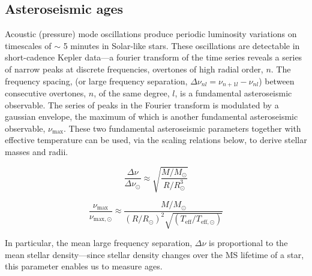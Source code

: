 \documentclass[12pt,preprint]{aastex}
\begin{document}
\subsection{Asteroseismic ages}
\label{sec:asteroseismic_targets}

Acoustic (pressure) mode oscillations produce periodic luminosity variations on timescales of $\sim$ 5 minutes in Solar-like stars.
These oscillations are detectable in short-cadence Kepler data---a fourier transform of the time series reveals a series of narrow peaks at discrete frequencies, overtones of high radial order, $n$.
The frequency spacing, (or large frequency separation, $\Delta\nu_{nl} = \nu_{n+1l}-\nu_{nl}$) between consecutive overtones, $n$, of the same degree, $l$, is a fundamental asteroseismic observable.
The series of peaks in the Fourier transform is modulated by a gaussian envelope, the maximum of which is another fundamental asteroseismic observable, $\nu_{\mathrm{max}}$.
These two fundamental asteroseismic parameters together with effective temperature can be used, via the scaling relations below, to derive stellar masses and radii.

\begin{equation}
\frac{\Delta\nu}{\Delta\nu_{\odot}} \approx \sqrt{\frac{M/M_{\odot}}{R/R_{\odot}^3}}
\label{eq:delta_nu}
\end{equation}

\begin{equation}
\frac{\nu_{\mathrm{max}}}{\nu_{\mathrm{max},\odot}} \approx \frac{M/M_{\odot}}{(R/R_{\odot})^2\sqrt{(T_{\mathrm{eff}}/T_{\mathrm{eff},\odot})}}
\label{eq:delta_nu}
\end{equation}

In particular, the mean large frequency separation, $\Delta\nu$ is proportional to the mean stellar density---since stellar density changes over the MS lifetime of a star, this parameter enables us to measure ages.
\end{document}
